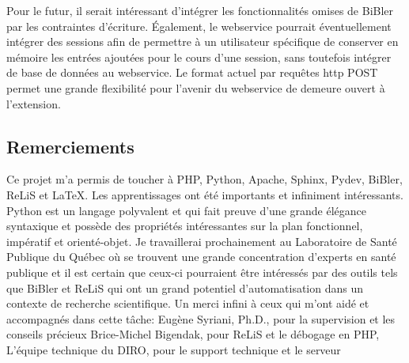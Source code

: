 \documentclass[12pt,titlepage]{article}
\begin{document}
Pour le futur, il serait intéressant d'intégrer les fonctionnalités omises de BiBler par les contraintes d'écriture. Également, le webservice pourrait éventuellement intégrer des sessions afin de permettre à un utilisateur spécifique de conserver en mémoire les entrées ajoutées pour le cours d'une session, sans toutefois intégrer de base de données au webservice. Le format actuel par requêtes http POST permet une grande flexibilité pour l'avenir du webservice de demeure ouvert à l'extension.

\subsection{Remerciements}

Ce projet m'a permis de toucher à PHP, Python, Apache, Sphinx, Pydev, BiBler, ReLiS et LaTeX. Les apprentissages ont été importants et infiniment intéressants. Python est un langage polyvalent et qui fait preuve d'une grande élégance syntaxique et possède des propriétés intéressantes sur la plan fonctionnel, impératif et orienté-objet. Je travaillerai prochainement au Laboratoire de Santé Publique du Québec où se trouvent une grande concentration d'experts en santé publique et il est certain que ceux-ci pourraient être intéressés par des outils tels que BiBler et ReLiS qui ont un grand potentiel d'automatisation dans un contexte de recherche scientifique. \mewline
Un merci infini à ceux qui m'ont aidé et accompagnés dans cette tâche: \newline
Eugène Syriani, Ph.D., pour la supervision et les conseils précieux\newline
Brice-Michel Bigendak, pour ReLiS et le débogage en PHP,
L'équipe technique du DIRO, pour le support technique et le serveur
{}
\listoffigures

\end{document}
